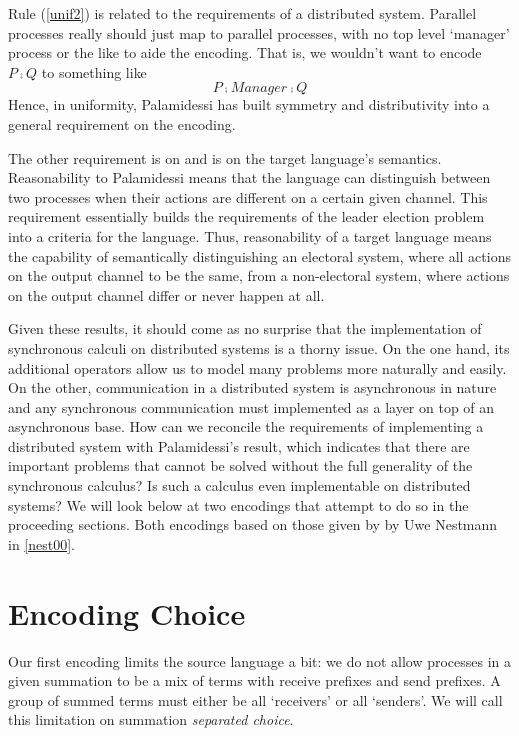 Rule (\ref{unif2}) is related to the requirements of a distributed system.  
Parallel processes really should just map to parallel processes, with no top level `manager' process or the like to aide the encoding.  
That is, we wouldn't want to encode $P \comp Q$ to something like 
\[
	P \comp Manager \comp Q
\]
Hence, in uniformity, Palamidessi has built symmetry and distributivity into a general requirement on the encoding.

The other requirement is on  and is on the target language's semantics.  
Reasonability to Palamidessi means that the language can distinguish between two processes when their actions are different on a certain given channel.  
This requirement essentially builds the requirements of the leader election problem into a criteria for the language.  
Thus, reasonability of a target language means the capability of semantically distinguishing an electoral system, where all actions on the output channel to be the same, from a non-electoral system, where actions on the output channel differ or never happen at all.

Given these results, it should come as no surprise that the implementation of synchronous calculi on distributed systems is a thorny issue.  
On the one hand, its additional operators allow us to model many problems more naturally and easily.  
On the other, communication in a distributed system is asynchronous in nature and any synchronous communication must implemented as a layer on top of an asynchronous base.  
How can we reconcile the requirements of implementing a distributed system with Palamidessi's result, which indicates that there are important problems that cannot be solved without the full generality of the synchronous calculus?  
Is such a calculus even implementable on distributed systems?
We will look below at two encodings that attempt to do so in the proceeding sections.  
Both encodings based on those given by by Uwe Nestmann in \ref{nest00}.

\section{Encoding Choice}\label{failedencoding}
Our first encoding limits the source language a bit: we do not allow processes in a given summation to be a mix of terms with receive prefixes and send prefixes.  
A group of summed terms must either be all `receivers' or all `senders'.  
We will call this limitation on summation \emph{separated choice}.

